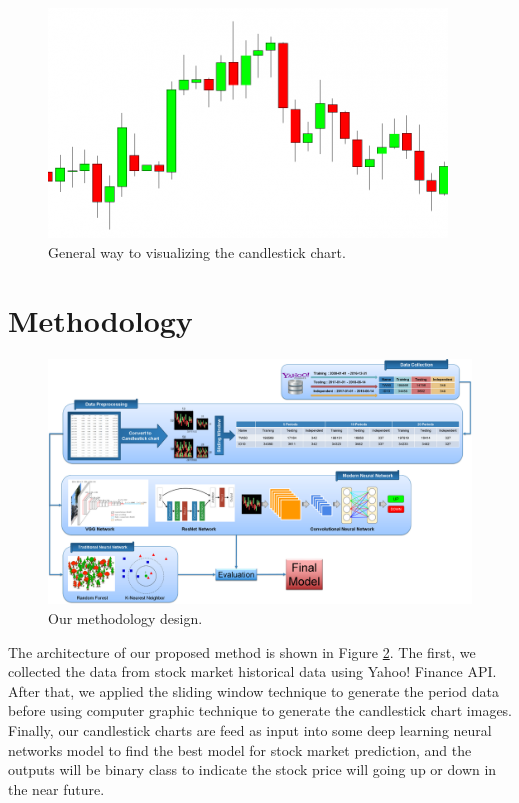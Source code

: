 \documentclass[10pt,twocolumn]{article}
\begin{document}
\begin{figure}
  \includegraphics[width=\linewidth]{figures/generalcandlestickchart.png}
  \caption{General way to visualizing the candlestick chart.}
  \label{fig:generalcandlestickchart}
\end{figure}

\section{Methodology}

\begin{figure}
  \includegraphics[width=\textwidth]{figures/methodology.png}
  \caption{Our methodology design.}
  \label{fig:methodologydesign}
\end{figure}

The architecture of our proposed method is shown in Figure \ref{fig:methodologydesign}. The first, we collected the data from stock market historical data using Yahoo! Finance API. After that, we applied the sliding window technique to generate the period data before using computer graphic technique to generate the candlestick chart images. Finally, our candlestick charts are feed as input into some deep learning neural networks model to find the best model for stock market prediction, and the outputs will be binary class to indicate the stock price will going up or down in the near future.
\end{document}
